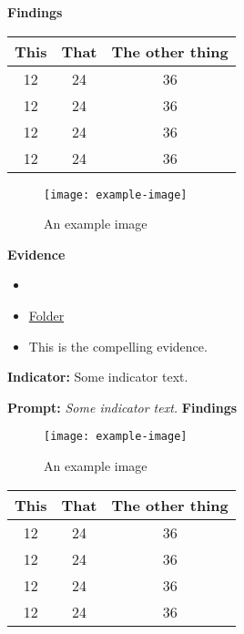 \documentclass{report}
\begin{document}
\noindent\textbf{Findings}

\blindtext

\begin{table}[!h]
\begin{tabular}{c | c || c}
This & That & The other thing \\
\hline
12   &  24  &  36 \\
12   &  24  &  36 \\
12   &  24  &  36 \\
12   &  24  &  36 \\
\end{tabular}
\end{table}


\blindtext

\begin{figure}[h!]
\caption[An example image]{An example image}
\centering
\texttt{[image: example-image]}
\end{figure}


\noindent\textbf{Evidence}
\vspace{-\topsep}

\begin{itemize}[leftmargin=*]
\setlength{\parskip}{0pt}
\setlength{\itemsep}{0pt plus 1pt}
\item \blindtext
\item \href{https://drive.google.com/a/cmis.ac.th/folderview?id=0ByVFfrm0zfolWE0yenprdktGVlk&usp=sharing}{Folder}
\item This is the compelling evidence.
\end{itemize}

\noindent\textbf{Indicator:} Some indicator text.

\noindent\textbf{Prompt:} \textit{Some indicator text.}
\noindent\textbf{Findings}

\blindtext

\begin{figure}[h!]
\caption[An example image]{An example image}
\centering
\texttt{[image: example-image]}
\end{figure}


\blindtext

\begin{table}[!h]
\begin{tabular}{c | c || c}
This & That & The other thing \\
\hline
12   &  24  &  36 \\
12   &  24  &  36 \\
12   &  24  &  36 \\
12   &  24  &  36 \\
\end{tabular}
\end{table}
\end{document}
